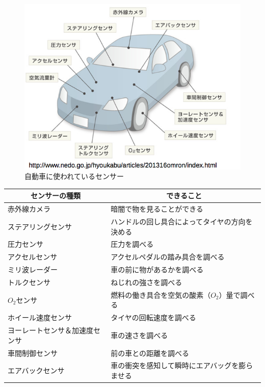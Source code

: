 \begin{figure}[htb]
\begin{center}
    \includegraphics[scale=1.0]{images/chap05/text05-img001.png}
    \caption{自動車に使われているセンサー}
    \label{fig1}
\end{center}
\end{figure}

\begin{table}[htb]
  \centering
  \begin{tabular}{|l|l|} \hline
\multicolumn{1}{|c|}{センサーの種類} & \multicolumn{1}{c|}{できること} \\ \hline\hline
赤外線カメラ & 暗闇で物を見ることができる \\
ステアリングセンサ & ハンドルの回し具合によってタイヤの方向を決める \\
圧力センサ & 圧力を調べる \\
アクセルセンサ & アクセルペダルの踏み具合を調べる \\
ミリ波レーダー & 車の前に物があるかを調べる \\
トルクセンサ & ねじれの強さを調べる \\
$O_2$センサ & 燃料の働き具合を空気の酸素（$O_2$）量で調べる \\
ホイール速度センサ & タイヤの回転速度を調べる \\
ヨーレートセンサ＆加速度センサ & 車の速さを調べる \\
車間制御センサ & 前の車との距離を調べる \\
エアバックセンサ & 車の衝突を感知して瞬時にエアバッグを膨らませる \\ \hline
  \end{tabular}
\end{table}

